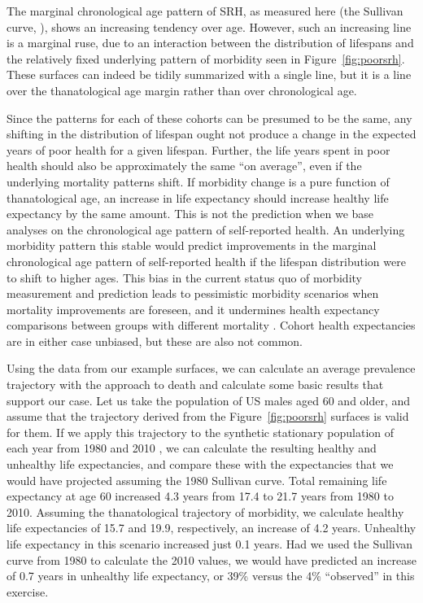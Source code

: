 \documentclass[12pt,oneside,a4paper]{article} %
\theoremstyle{definition}
\begin{document}
The marginal chronological age pattern of SRH, as measured
here (the Sullivan curve, \citep{Sullivan1970}), shows an increasing tendency
over age.
However, such an increasing line is a marginal ruse, due to an interaction
between the distribution of lifespans and the relatively fixed underlying
pattern of morbidity seen in Figure~\ref{fig:poorsrh}. These surfaces can indeed
be tidily summarized with a single line, but it is a line over the
thanatological age margin rather than over chronological age. 

Since the patterns for each of these cohorts can be presumed to be the same, any
shifting in the distribution of lifespan ought not produce a change in the
expected years of poor health for a given lifespan. Further, the life years
spent in poor health should also be approximately the same ``on average'', even
if the underlying mortality patterns shift. If morbidity change is a pure
function of thanatological age, an increase in life expectancy should increase
healthy life expectancy by the same amount. This is not the prediction when we
base analyses on the chronological age pattern of self-reported health. An
underlying morbidity pattern this stable would predict improvements in the
marginal chronological age pattern of self-reported health if the lifespan
distribution were to shift to higher ages. This bias in the current status quo
of morbidity measurement and prediction leads to pessimistic morbidity scenarios
when mortality improvements are foreseen, and it undermines health expectancy
comparisons between groups with different mortality \citep{vanRaalte2015HLE}.
Cohort health expectancies are in either case unbiased, but these are also not common.

Using the data from our example surfaces, we can calculate an average prevalence
trajectory with the approach to death and calculate some basic results that
support our case. Let us take the population of US males aged 60 and older, and
assume that the trajectory derived from the Figure~\ref{fig:poorsrh} surfaces
is valid for them.
If we apply this trajectory to the synthetic stationary population of each
year from 1980 and 2010 , we can calculate the resulting healthy
and unhealthy life expectancies, and compare these with the expectancies that we would have projected assuming the 1980 Sullivan curve.
Total remaining life expectancy at age 60 increased 4.3 years from 17.4 to 21.7
years from 1980 to 2010. Assuming the thanatological trajectory of
morbidity, we calculate healthy life expectancies of 15.7 and 19.9,
respectively, an increase of 4.2 years. Unhealthy life expectancy in this
scenario increased just 0.1 years. Had we used the Sullivan curve from 1980 to
calculate the 2010 values, we would have predicted an increase of 0.7 years in
unhealthy life expectancy, or 39\% versus the 4\% ``observed'' in this
exercise.
\end{document}
